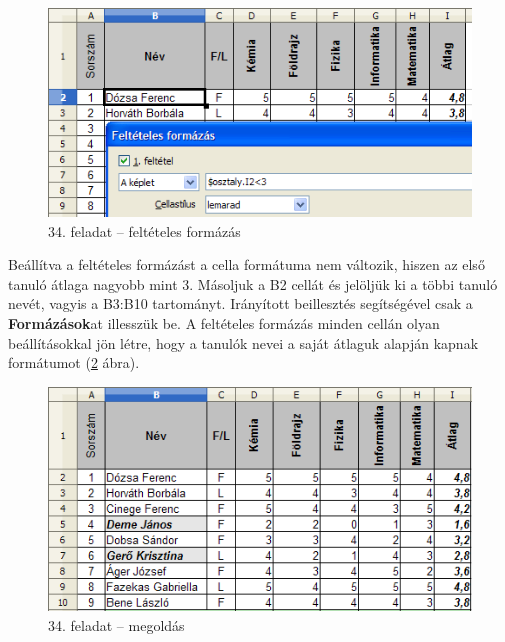 \begin{figure}[!h]
\begin{center}
\includegraphics[width=13.042cm]{oocalcv1-img162.png}
\caption{34. feladat --  feltételes formázás}\label{34-feladatFeltételes}
\end{center}
\end{figure}

Beállítva a feltételes formázást a cella formátuma nem
változik, hiszen az első tanuló átlaga nagyobb mint 3.
Másoljuk a B2 cellát és jelöljük ki a többi tanuló
nevét, vagyis a B3:B10 tartományt. Irányított beillesztés
segítségével csak a \textbf{Formázások}at illesszük be. A
feltételes formázás minden cellán olyan beállításokkal
jön létre, hogy a tanulók nevei a saját átlaguk alapján
kapnak formátumot (\ref{34-feladatMegoldás} ábra).

\begin{figure}[!h]
\begin{center}
\includegraphics[width=12.883cm]{oocalcv1-img163.png}
\caption{34. feladat --  megoldás}\label{34-feladatMegoldás}
\end{center}
\end{figure}

